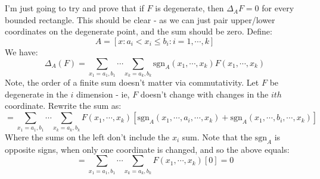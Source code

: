 \documentclass[12pt,a4paper]{article}
\newcommand{\1}[1]{\mathbbm{1}\left\{ #1 \right\}}
\newcommand{\sgn}{\text{sgn}}
\begin{document}
\\\\
I'm just going to try and prove that if $F$ is degenerate, then $\Delta_A F = 0$ for every bounded rectangle. This should be clear - as we can just pair upper/lower coordinates on the degenerate point, and the sum should be zero. Define:
$$
	A = \left[x: a_i < x_i \leq b_i : i = 1, \cdots, k\right]
$$
We have:
$$
	\Delta_A(F) = \sum_{x_1 = a_1,b_1} \cdots \sum_{x_k = a_k,b_k} \sgn_A(x_1, \cdots, x_k) F(x_1, \cdots, x_k)
$$
Note, the order of a finite sum doesn't matter via commutativity. Let $F$ be degenerate in the $i$ dimension - ie, $F$ doesn't change with changes in the $ith$ coordinate. Rewrite the sum as:
$$
	= \sum_{x_1 = a_1,b_1} \cdots \sum_{x_k = a_k,b_k} 
	F(x_1, \cdots, x_k) \left[\sgn_A(x_1, \cdots, a_i, \cdots, x_k) + \sgn_A(x_1, \cdots, b_i, \cdots, x_k)\right]
$$
Where the sums on the left don't include the $x_i$ sum. Note that the $\sgn_A$ is opposite signs, when only one coordinate is changed, and so the above equals:
$$
	= \sum_{x_1 = a_1,b_1} \cdots \sum_{x_k = a_k,b_k} 
	F(x_1, \cdots, x_k) \left[0\right] = 0
$$
\end{document}
